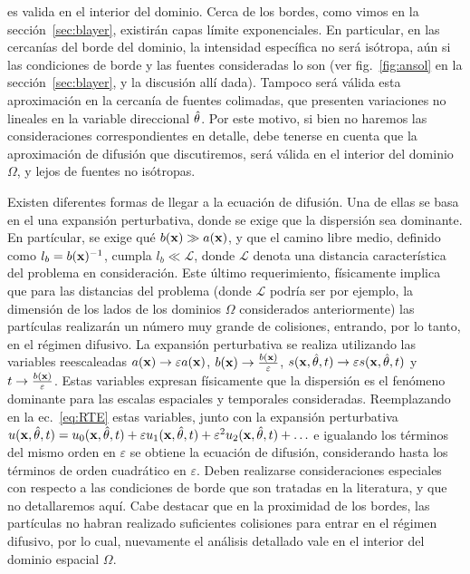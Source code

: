 es valida en el interior del dominio. Cerca de los bordes, como vimos en la sección~\ref{sec:blayer}, existirán capas límite exponenciales. 
En particular, en las cercanías del borde del dominio, la intensidad específica no será isótropa, 
aún si las condiciones de borde y las fuentes consideradas lo son (ver fig.~\ref{fig:ansol} 
en la sección~\ref{sec:blayer}, y la discusión allí dada). Tampoco será válida esta 
aproximación en la cercanía de fuentes colimadas, que presenten variaciones no lineales en la variable 
direccional $\hat{\theta}$. Por este motivo, si bien no haremos las consideraciones correspondientes 
en detalle, debe tenerse en cuenta que la aproximación de difusión que discutiremos, 
será válida en el interior del dominio $\Omega$, y lejos de fuentes no isótropas. 

Existen diferentes formas 
de llegar a la ecuación de difusión. Una de ellas se basa en el  \cite{Larsen1974,Larsen1987,Arridge2009} una expansión perturbativa, 
donde se exige que la dispersión sea dominante. En partícular, se exige qué $b(\mathbf{x}) \gg a(\mathbf{x})$, 
y que el camino libre medio, definido como $l_b=b(\mathbf{x})^{-1}$, cumpla $l_b\ll \mathcal{L}$, 
donde $\mathcal{L}$ denota una distancia característica del problema en consideración. 
Este último requerimiento, físicamente implica que para las distancias del problema (donde $\mathcal{L}$ 
podría ser por ejemplo, la dimensión de los lados de los dominios $\Omega$ considerados anteriormente) las partículas realizarán un número muy grande de colisiones, entrando, por lo tanto, en el régimen difusivo. La expansión perturbativa se realiza utilizando las variables 
reescaleadas $a(\mathbf{x}) \rightarrow \varepsilon a(\mathbf{x})$, $b(\mathbf{x}) \rightarrow \frac{b(\mathbf{x})}{\varepsilon}$, $s(\mathbf{x},\hat{\theta},t)\rightarrow  \varepsilon s(\mathbf{x},\hat{\theta},t)$ y $t\rightarrow \frac{b(\mathbf{x})}{\varepsilon}$. Estas variables  expresan físicamente que la dispersión es el fenómeno dominante para las 
escalas espaciales y temporales consideradas. Reemplazando en la ec.~\eqref{eq:RTE} estas variables, junto con la expansión perturbativa $u(\mathbf{x},\hat{\theta},t)=u_0(\mathbf{x},\hat{\theta},t)+\varepsilon u_1(\mathbf{x},\hat{\theta},t)+\varepsilon^2 u_2(\mathbf{x},\hat{\theta},t)+\ldots$ e igualando los términos del mismo orden en $\varepsilon$ se obtiene la ecuación de difusión, considerando hasta los términos de orden cuadrático en $\varepsilon$. Deben realizarse consideraciones especiales con respecto a las condiciones de 
borde que son tratadas en la literatura, y que no detallaremos aquí. Cabe destacar que en la proximidad de los bordes, las partículas no habran realizado suficientes colisiones para entrar en el régimen difusivo, por lo cual, nuevamente el análisis detallado vale en el interior del dominio espacial $\Omega$. 

